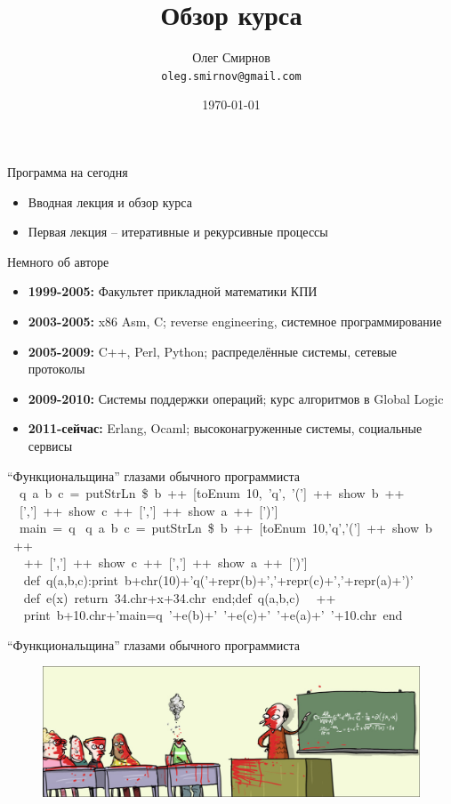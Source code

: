 \documentclass{beamer}
\title[Введение в функциональное программирование]{Обзор курса}
\author{Олег Смирнов\\
\texttt{oleg.smirnov@gmail.com}}
\institute{УНК ``ИПСА'' НТУУ ``КПИ''}
\date{\today}
\begin{document}
\begin{frame}
\titlepage
\end{frame}

\begin{frame}{Программа на сегодня}
  \begin{itemize}
    \item Вводная лекция и обзор курса
    \item Первая лекция -- итеративные и рекурсивные процессы
  \end{itemize}
\end{frame}

\begin{frame}{Немного об авторе}
  \begin{itemize}
  \item {\bf 1999-2005:} Факультет прикладной математики КПИ
  \item {\bf 2003-2005:} x86 Asm, C; reverse engineering, системное программирование
  \item {\bf 2005-2009:} C++, Perl, Python; распределённые системы, сетевые протоколы
  \item {\bf 2009-2010:} Системы поддержки операций; курс алгоритмов в Global Logic
  \item {\bf 2011-сейчас:} Erlang, Ocaml; высоконагруженные системы, социальные сервисы
  \end{itemize}
\end{frame}

\begin{frame}{``Функциональщина'' глазами обычного программиста}
  \small{~~q~a~b~c~=~putStrLn~\$~b~++~[toEnum~10,~'q',~'(']~++~show~b~++\\
    ~~[',']~++~show~c~++~[',']~++~show~a~++~[')']\\
    ~~main~=~q~ q~a~b~c~=~putStrLn~\$~b~++~[toEnum~10,'q','(']~++~show~b~ ~++~\\
    ~~ ++~[',']~++~show~c~++~[',']~++~show~a~++~[')'] \\
    ~~ def~q(a,b,c):print~b+chr(10)+'q('+repr(b)+','+repr(c)+','+repr(a)+')' \\
    ~~ def~e(x)~return~34.chr+x+34.chr~end;def~q(a,b,c)~ ~++~\\
    ~~ print~b+10.chr+'main=q~'+e(b)+'~'+e(c)+'~'+e(a)+'~'+10.chr~end}
\end{frame}

\begin{frame}{``Функциональщина'' глазами обычного программиста}
\begin{figure}
   \includegraphics[scale=0.44]{lecture0/Matematik-Hjerne-Formel-WM_strip_DK_20090625.eps}
\end{figure}
\end{frame}
\end{document}
